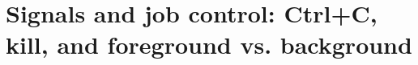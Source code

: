 \chapter{Signals and job control: Ctrl+C, kill, and foreground vs. background}
\label{ch:signals-and-job-control-ctrl-c-kill-and}

